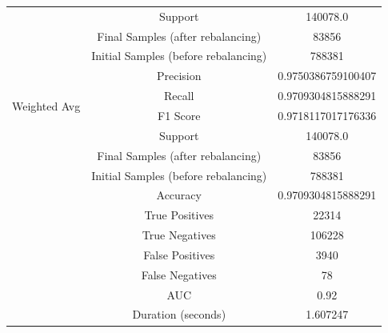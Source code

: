 \begin{longtable}{|c|c|c|}
 & Support & 140078.0 \\
 & Final Samples (after rebalancing) & 83856 \\
 & Initial Samples (before rebalancing) & 788381 \\
\hline
\multirow{4}{*}{Weighted Avg} & Precision & 0.9750386759100407 \\
 & Recall & 0.9709304815888291 \\
 & F1 Score & 0.9718117017176336 \\
 & Support & 140078.0 \\
 & Final Samples (after rebalancing) & 83856 \\
 & Initial Samples (before rebalancing) & 788381 \\
\hline
& Accuracy & 0.9709304815888291 \\ \hline
& True Positives & 22314 \\ \hline
& True Negatives & 106228 \\ \hline
& False Positives & 3940 \\ \hline
& False Negatives & 78 \\ \hline
& AUC & 0.92 \\ \hline
& Duration (seconds) & 1.607247 \\ \hline
\end{longtable}


